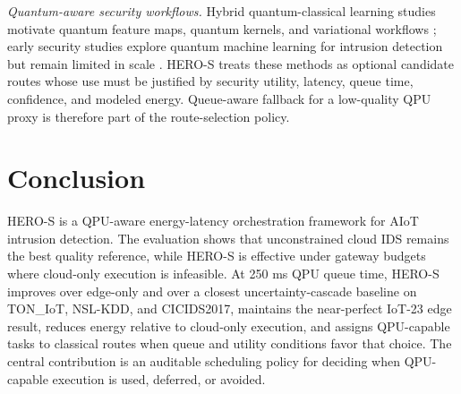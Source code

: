 \documentclass[conference]{IEEEtran}
\begin{document}
\textit{Quantum-aware security workflows.} Hybrid quantum-classical learning studies motivate quantum feature maps, quantum kernels, and variational workflows \cite{havlicek2019supervised,schuld2019qml,cerezo2021vqa}; early security studies explore quantum machine learning for intrusion detection but remain limited in scale \cite{kalinin2023qmlids}. HERO-S treats these methods as optional candidate routes whose use must be justified by security utility, latency, queue time, confidence, and modeled energy. Queue-aware fallback for a low-quality QPU proxy is therefore part of the route-selection policy.

\section{Conclusion}
HERO-S is a QPU-aware energy-latency orchestration framework for AIoT intrusion detection. The evaluation shows that unconstrained cloud IDS remains the best quality reference, while HERO-S is effective under gateway budgets where cloud-only execution is infeasible. At 250 ms QPU queue time, HERO-S improves over edge-only and over a closest uncertainty-cascade baseline on TON\_IoT, NSL-KDD, and CICIDS2017, maintains the near-perfect IoT-23 edge result, reduces energy relative to cloud-only execution, and assigns QPU-capable tasks to classical routes when queue and utility conditions favor that choice. The central contribution is an auditable scheduling policy for deciding when QPU-capable execution is used, deferred, or avoided.



\end{document}
